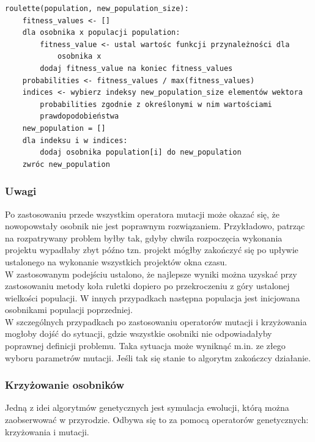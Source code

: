 \documentclass[12pt,a4paper]{article}
\theoremstyle{definition}
\begin{document}
\begin{tcolorbox}[title=Metoda koła ruletki -- pseudokod]
\begin{verbatim}
roulette(population, new_population_size):
    fitness_values <- []
    dla osobnika x populacji population:
        fitness_value <- ustal wartośc funkcji przynależności dla 
            osobnika x
        dodaj fitness_value na koniec fitness_values
    probabilities <- fitness_values / max(fitness_values)
    indices <- wybierz indeksy new_population_size elementów wektora 
        probabilities zgodnie z określonymi w nim wartościami
        prawdopodobieństwa
    new_population = []
    dla indeksu i w indices:
        dodaj osobnika population[i] do new_population
    zwróc new_population
\end{verbatim}
\end{tcolorbox}

\subsubsection*{Uwagi}
Po zastosowaniu przede wszystkim operatora mutacji może okazać się, że nowopowstały osobnik nie jest poprawnym rozwiązaniem. Przykładowo, patrząc na rozpatrywany problem byłby tak, gdyby chwila rozpoczęcia wykonania projektu wypadłaby zbyt późno tzn. projekt mógłby zakończyć się po upływie ustalonego na wykonanie wszystkich projektów okna czasu. \\

\noindent 
W zastosowanym podejściu ustalono, że najlepsze wyniki można uzyskać przy zastosowaniu metody koła ruletki dopiero po przekroczeniu z góry ustalonej wielkości populacji. W innych przypadkach następna populacja jest inicjowana osobnikami populacji poprzedniej. \\

\noindent
W szczególnych przypadkach po zastosowaniu operatorów mutacji i krzyżowania mogłoby dojść do sytuacji, gdzie wszystkie osobniki nie odpowiadałyby poprawnej definicji problemu. Taka sytuacja może wyniknąć m.in. ze złego wyboru parametrów mutacji. Jeśli tak się stanie to algorytm zakończcy działanie.

\subsubsection{Krzyżowanie osobników}
Jedną z idei algorytmów genetycznych jest symulacja ewolucji, którą można zaobserwować w przyrodzie. Odbywa się to za pomocą operatorów genetycznych: krzyżowania i mutacji.\\
\end{document}
